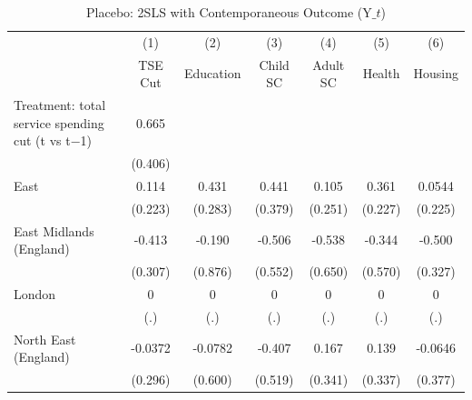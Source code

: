 \begin{table}[htbp]\centering
\def\sym#1{\ifmmode^{#1}\else\(^{#1}\)\fi}
\caption{Placebo: 2SLS with Contemporaneous Outcome (Y$\_t$)}
\begin{tabular}{l*{6}{c}}
\toprule
                    &\multicolumn{1}{c}{(1)}&\multicolumn{1}{c}{(2)}&\multicolumn{1}{c}{(3)}&\multicolumn{1}{c}{(4)}&\multicolumn{1}{c}{(5)}&\multicolumn{1}{c}{(6)}\\
                    &\multicolumn{1}{c}{TSE Cut}&\multicolumn{1}{c}{Education}&\multicolumn{1}{c}{Child SC}&\multicolumn{1}{c}{Adult SC}&\multicolumn{1}{c}{Health}&\multicolumn{1}{c}{Housing}\\
\midrule
Treatment: total service spending cut (t vs t−1)&       0.665         &                     &                     &                     &                     &                     \\
                    &     (0.406)         &                     &                     &                     &                     &                     \\
\addlinespace
East                &       0.114         &       0.431         &       0.441         &       0.105         &       0.361         &      0.0544         \\
                    &     (0.223)         &     (0.283)         &     (0.379)         &     (0.251)         &     (0.227)         &     (0.225)         \\
\addlinespace
East Midlands (England)&      -0.413         &      -0.190         &      -0.506         &      -0.538         &      -0.344         &      -0.500         \\
                    &     (0.307)         &     (0.876)         &     (0.552)         &     (0.650)         &     (0.570)         &     (0.327)         \\
\addlinespace
London              &           0         &           0         &           0         &           0         &           0         &           0         \\
                    &         (.)         &         (.)         &         (.)         &         (.)         &         (.)         &         (.)         \\
\addlinespace
North East (England)&     -0.0372         &     -0.0782         &      -0.407         &       0.167         &       0.139         &     -0.0646         \\
                    &     (0.296)         &     (0.600)         &     (0.519)         &     (0.341)         &     (0.337)         &     (0.377)         \\

\end{tabular}
\end{table}
